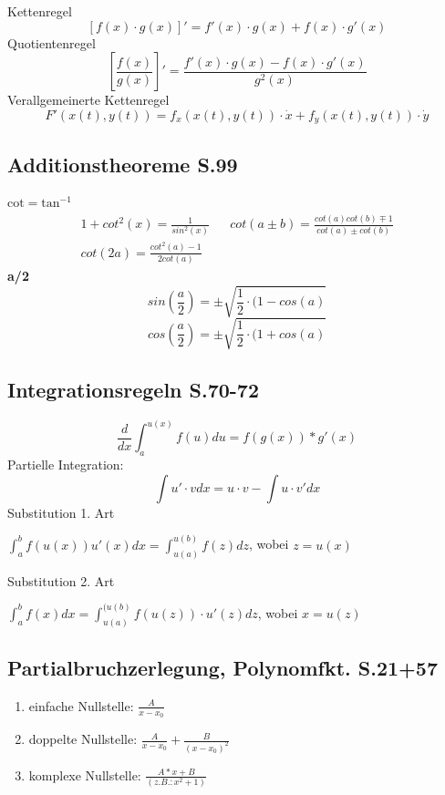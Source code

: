        Kettenregel 
       $$[f(x) \cdot  g(x)]' = f'(x)\cdot g(x) + f(x) \cdot  g'(x)$$
       Quotientenregel
       $$ [\frac{f(x)}{g(x)}]' = \frac{f'(x)\cdot g(x) - f(x)\cdot g'(x)}{g^2(x)} $$
       Verallgemeinerte Kettenregel
       $$F'(x(t), y(t)) = f_x (x(t), y(t)) \cdot  \dot{x} + f_y (x(t), y(t)) \cdot  \dot{y} $$
       
\subsection{Additionstheoreme \texorpdfstring{\hfill S.99}{S.99}}
    \textbf{$\textrm{cot} = \textrm{tan}^{-1}$}
    \begin{align*}
            1 + cot^2(x) = \frac{1}{sin^2(x)} && cot(a \pm b) = \frac{cot(a)cot(b) \mp 1}{cot(a) \pm cot(b)} \\
            cot(2a) = \frac{cot^2(a) -1}{2 cot(a)}
    \end{align*}
    \textbf{a/2}
    $$ sin \left( \frac{a}{2} \right) = \pm \sqrt{\frac{1}{2}\cdot (1-cos(a)} $$
    $$ cos \left( \frac{a}{2} \right) = \pm \sqrt{\frac{1}{2}\cdot (1+cos(a)} $$

\subsection{Integrationsregeln \texorpdfstring{\hfill S.70-72}{S.70-72}}
       $$ \frac{d}{dx} \int_a^{u(x)} f(u) du = f(g(x)) * g'(x)$$
       Partielle Integration: 
       $$ \int u'\cdot v dx = u\cdot v - \int u\cdot v' dx $$
       Substitution 1. Art \vspace{2pt}
       \begin{center}
           $ \int_a^b f(u(x))u'(x) dx = \int_{u(a)}^{u(b)} f(z) dz $, wobei $ z = u(x)$
       \end{center}
       
       Substitution 2. Art \vspace{2pt}
       \begin{center}
           $ \int_a^b f(x) dx = \int_{u(a)}^{(u(b)} f(u(z))\cdot u'(z) dz $, wobei $ x = u(z)$
       \end{center}

\subsection{Partialbruchzerlegung, Polynomfkt. \texorpdfstring{\hfill S.21+57}{S.21+57}}
        \vspace{3pt}
       \begin{enumerate}
           \item einfache Nullstelle: $ \frac{A}{x - x_0}$
           \item doppelte Nullstelle: $\frac{A}{x - x_0} + \frac{B}{(x-x_0)^2} $
           \item komplexe Nullstelle: $ \frac{A*x + B}{(z.B.: x^2 + 1)}$
       \end{enumerate}

